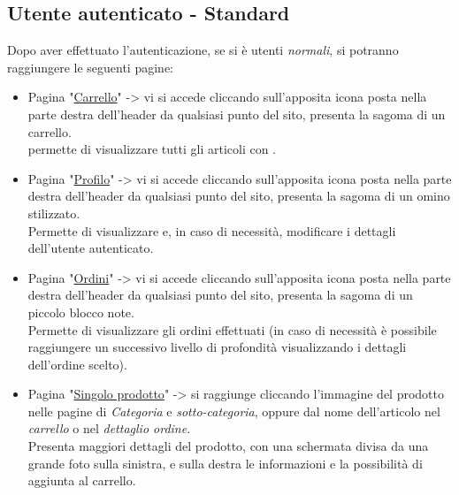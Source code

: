 \subsection{Utente autenticato - Standard}
Dopo aver effettuato l'autenticazione, se si è utenti \textit{normali}, si potranno raggiungere le seguenti pagine:

\begin{itemize}
	\item Pagina "\underline{Carrello}" -> vi si accede cliccando sull’apposita icona posta nella parte destra dell'header da qualsiasi punto del sito, presenta la sagoma di un carrello.\\
	permette di visualizzare tutti gli articoli con .
	\item Pagina "\underline{Profilo}" ->  vi si accede cliccando sull’apposita icona posta nella parte destra dell'header da qualsiasi punto del sito, presenta la sagoma di un omino stilizzato.\\ Permette di visualizzare e, in caso di necessità, modificare i dettagli dell’utente autenticato.
	\item Pagina "\underline{Ordini}" ->  vi si accede cliccando sull’apposita icona posta nella parte destra dell'header da qualsiasi punto del sito, presenta la sagoma di un piccolo blocco note.\\ Permette di visualizzare gli ordini effettuati (in caso di necessità è possibile raggiungere un successivo livello di profondità visualizzando i dettagli dell'ordine scelto).
	\item Pagina "\underline{Singolo prodotto}" -> si raggiunge cliccando l'immagine del prodotto nelle pagine di \textit{Categoria} e \textit{sotto-categoria}, oppure dal nome dell'articolo nel \textit{carrello} o nel \textit{dettaglio ordine}.\\
	Presenta maggiori dettagli del prodotto, con una schermata divisa da una grande foto sulla sinistra, e sulla destra le informazioni e la possibilità di aggiunta al carrello.
\end{itemize}

